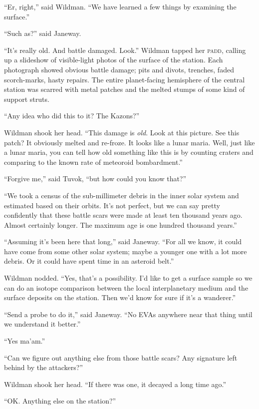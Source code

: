 \documentclass[twoside,letterpaper,12pt]{memoir}
\begin{document}
``Er, right,'' said Wildman. ``We have learned a few things by examining the surface.''

``Such as?'' said Janeway.

``It's really old. And battle damaged. Look.'' Wildman tapped her \textsc{padd}, calling up a slideshow of visible-light photos of the surface of the station. Each photograph showed obvious battle damage; pits and divots, trenches, faded scorch-marks, hasty repairs. The entire planet-facing hemisphere of the central station was scarred with metal patches and the melted stumps of some kind of support struts.

``Any idea who did this to it? The Kazons?''

Wildman shook her head. ``This damage is \textit{old}. Look at this picture. See this patch? It obviously melted and re-froze. It looks like a lunar maria. Well, just like a lunar maria, you can tell how old something like this is by counting craters and comparing to the known rate of meteoroid bombardment.''

``Forgive me,'' said Tuvok, ``but how could you know that?''

``We took a census of the sub-millimeter debris in the inner solar system and estimated based on their orbits. It's not perfect, but we can say pretty confidently that these battle scars were made at least ten thousand years ago. Almost certainly longer. The maximum age is one hundred thousand years.''

``Assuming it's been here that long,'' said Janeway. ``For all we know, it could have come from some other solar system; maybe a younger one with a lot more debris. Or it could have spent time in an asteroid belt.''

Wildman nodded. ``Yes, that's a possibility. I'd like to get a surface sample so we can do an isotope comparison between the local interplanetary medium and the surface deposits on the station. Then we'd know for sure if it's a wanderer.''

``Send a probe to do it,'' said Janeway. ``No \textsc{EVA}s anywhere near that thing until we understand it better.''

``Yes ma'am.''

``Can we figure out anything else from those battle scars? Any signature left behind by the attackers?''

Wildman shook her head. ``If there was one, it decayed a long time ago.''

``OK. Anything else on the station?''
\end{document}
